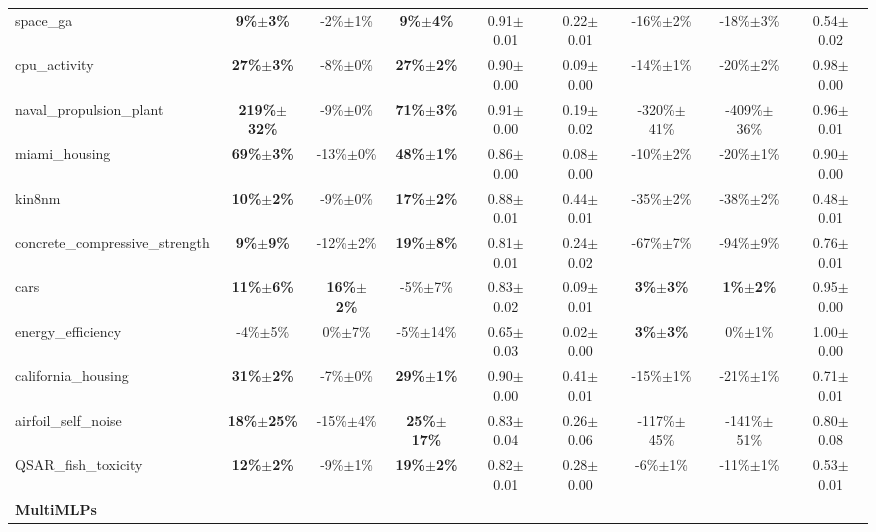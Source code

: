 \begin{table}[t]
\begin{small}
\begin{sc}
{\begin{tabular}{lcccccccc}
space\_ga  &  \textbf{9\%$\pm$3\%}  &  -2\%$\pm$1\%  &  \textbf{9\%$\pm$4\%}  &  0.91$\pm$0.01  &  0.22$\pm$0.01  &  -16\%$\pm$2\%  &  -18\%$\pm$3\%  &  0.54$\pm$0.02 \\
cpu\_activity  &  \textbf{27\%$\pm$3\%}  &  -8\%$\pm$0\%  &  \textbf{27\%$\pm$2\%}  &  0.90$\pm$0.00  &  0.09$\pm$0.00  &  -14\%$\pm$1\%  &  -20\%$\pm$2\%  &  0.98$\pm$0.00 \\
naval\_propulsion\_plant  &  \textbf{219\%$\pm$32\%}  &  -9\%$\pm$0\%  &  \textbf{71\%$\pm$3\%}  &  0.91$\pm$0.00  &  0.19$\pm$0.02  &  -320\%$\pm$41\%  &  -409\%$\pm$36\%  &  0.96$\pm$0.01 \\
miami\_housing  &  \textbf{69\%$\pm$3\%}  &  -13\%$\pm$0\%  &  \textbf{48\%$\pm$1\%}  &  0.86$\pm$0.00  &  0.08$\pm$0.00  &  -10\%$\pm$2\%  &  -20\%$\pm$1\%  &  0.90$\pm$0.00 \\
kin8nm  &  \textbf{10\%$\pm$2\%}  &  -9\%$\pm$0\%  &  \textbf{17\%$\pm$2\%}  &  0.88$\pm$0.01  &  0.44$\pm$0.01  &  -35\%$\pm$2\%  &  -38\%$\pm$2\%  &  0.48$\pm$0.01 \\
concrete\_compressive\_strength  &  \textbf{9\%$\pm$9\%}  &  -12\%$\pm$2\%  &  \textbf{19\%$\pm$8\%}  &  0.81$\pm$0.01  &  0.24$\pm$0.02  &  -67\%$\pm$7\%  &  -94\%$\pm$9\%  &  0.76$\pm$0.01 \\
cars  &  \textbf{11\%$\pm$6\%}  &  \textbf{16\%$\pm$2\%}  &  -5\%$\pm$7\%  &  0.83$\pm$0.02  &  0.09$\pm$0.01  &  \textbf{3\%$\pm$3\%}  &  \textbf{1\%$\pm$2\%}  &  0.95$\pm$0.00 \\
energy\_efficiency  &  -4\%$\pm$5\%  &  0\%$\pm$7\%  &  -5\%$\pm$14\%  &  0.65$\pm$0.03  &  0.02$\pm$0.00  &  \textbf{3\%$\pm$3\%}  &  0\%$\pm$1\%  &  1.00$\pm$0.00 \\
california\_housing  &  \textbf{31\%$\pm$2\%}  &  -7\%$\pm$0\%  &  \textbf{29\%$\pm$1\%}  &  0.90$\pm$0.00  &  0.41$\pm$0.01  &  -15\%$\pm$1\%  &  -21\%$\pm$1\%  &  0.71$\pm$0.01 \\
airfoil\_self\_noise  &  \textbf{18\%$\pm$25\%}  &  -15\%$\pm$4\%  &  \textbf{25\%$\pm$17\%}  &  0.83$\pm$0.04  &  0.26$\pm$0.06  &  -117\%$\pm$45\%  &  -141\%$\pm$51\%  &  0.80$\pm$0.08 \\
QSAR\_fish\_toxicity  &  \textbf{12\%$\pm$2\%}  &  -9\%$\pm$1\%  &  \textbf{19\%$\pm$2\%}  &  0.82$\pm$0.01  &  0.28$\pm$0.00  &  -6\%$\pm$1\%  &  -11\%$\pm$1\%  &  0.53$\pm$0.01 \\
\cmidrule(lr){1-9}
\textbf{MultiMLPs} & & & & & & & & \\ \cmidrule(lr){1-9}


\end{tabular}}
\end{sc}
\end{small}
\end{table}

